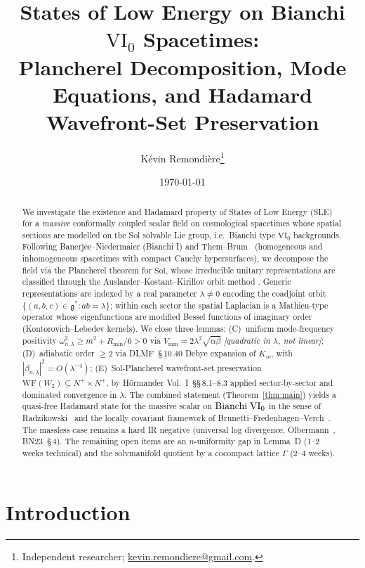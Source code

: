 \documentclass[11pt,a4paper]{article}
\title{States of Low Energy on Bianchi $\mathrm{VI_0}$ Spacetimes:\\
       Plancherel Decomposition, Mode Equations, and Hadamard
       Wavefront-Set Preservation}
\author{K\'evin Remondi\`ere\thanks{Independent researcher; \href{mailto:kevin.remondiere@gmail.com}{kevin.remondiere@gmail.com}.}}
\date{\today}
\theoremstyle{definition}
\newcommand{\Sol}{\mathrm{Sol}}
\newcommand{\WF}{\mathrm{WF}}
\newcommand{\BVI}{{\rm Bianchi\;VI_0}}
\begin{document}
\maketitle

\begin{abstract}
We investigate the existence and Hadamard property of States of Low Energy (SLE)
for a \emph{massive} conformally coupled scalar field on cosmological spacetimes whose
spatial sections are modelled on the Sol solvable Lie group, i.e.\ Bianchi type
$\mathrm{VI_0}$ backgrounds.
Following Banerjee--Niedermaier \cite{BN23} (Bianchi I) and Them--Brum~\cite{TB13}
(homogeneous and inhomogeneous spacetimes with compact Cauchy hypersurfaces),
we decompose the field via the Plancherel theorem for $\Sol$, whose irreducible unitary
representations are classified through the Auslander--Kostant--Kirillov orbit method
\cite{AK71,Kir04}.  Generic representations are indexed by a real parameter
$\lambda \neq 0$ encoding the coadjoint orbit $\{(a,b,c)\in\mathfrak{g}^*: ab = \lambda\}$;
within each sector the spatial Laplacian is a Mathieu-type operator whose
eigenfunctions are modified Bessel functions of imaginary order
(Kontorovich--Lebedev kernels).
We close three lemmas:
(C)~uniform mode-frequency positivity
$\omega^2_{n,\lambda} \geq m^2 + R_{\min}/6 > 0$
via $V_{\min} = 2\lambda^2\sqrt{\alpha\beta}$
\emph{[quadratic in $\lambda$, not linear]};
(D)~adiabatic order $\geq 2$ via DLMF~\S\,10.40 Debye expansion of $K_{i\nu}$,
with $|\beta_{n,\lambda}|^2 = O(\lambda^{-4})$;
(E)~Sol-Plancherel wavefront-set preservation
$\WF(W_2)\subseteq N^+\times N^+$, by H\"ormander Vol.~I~\S\S\,8.1--8.3
applied sector-by-sector and dominated convergence in $\lambda$.
The combined statement (Theorem~\ref{thm:main}) yields a quasi-free Hadamard
state for the massive scalar on $\BVI$ in the sense of Radzikowski~\cite{Rad96}
and the locally covariant framework of Brunetti--Fredenhagen--Verch~\cite{BFV03}.
The massless case remains a hard IR negative
(universal log divergence, Olbermann~\cite{Olb07}, BN23~\S\,4).
The remaining open items are an $n$-uniformity gap in Lemma~D
(1--2 weeks technical) and the solvmanifold quotient by a cocompact lattice
$\Gamma$ (2--4 weeks).
\end{abstract}

\tableofcontents

\section{Introduction}
\end{document}
